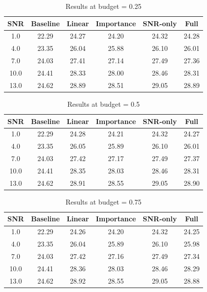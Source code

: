\begin{table}[h]
\centering
\caption{Results at budget = 0.25}
\begin{tabular}{c|ccccc}
\hline
SNR & Baseline & Linear & Importance & SNR-only & Full \\
\hline
1.0 & 22.29 & 24.27 & 24.20 & 24.32 & 24.28 \\
4.0 & 23.35 & 26.04 & 25.88 & 26.10 & 26.01 \\
7.0 & 24.03 & 27.41 & 27.14 & 27.49 & 27.36 \\
10.0 & 24.41 & 28.33 & 28.00 & 28.46 & 28.31 \\
13.0 & 24.62 & 28.89 & 28.51 & 29.05 & 28.89 \\
\hline
\end{tabular}
\end{table}

\begin{table}[h]
\centering
\caption{Results at budget = 0.5}
\begin{tabular}{c|ccccc}
\hline
SNR & Baseline & Linear & Importance & SNR-only & Full \\
\hline
1.0 & 22.29 & 24.28 & 24.21 & 24.32 & 24.27 \\
4.0 & 23.35 & 26.05 & 25.89 & 26.10 & 26.01 \\
7.0 & 24.03 & 27.42 & 27.17 & 27.49 & 27.37 \\
10.0 & 24.41 & 28.35 & 28.03 & 28.46 & 28.31 \\
13.0 & 24.62 & 28.91 & 28.55 & 29.05 & 28.90 \\
\hline
\end{tabular}
\end{table}

\begin{table}[h]
\centering
\caption{Results at budget = 0.75}
\begin{tabular}{c|ccccc}
\hline
SNR & Baseline & Linear & Importance & SNR-only & Full \\
\hline
1.0 & 22.29 & 24.26 & 24.20 & 24.32 & 24.25 \\
4.0 & 23.35 & 26.04 & 25.89 & 26.10 & 25.98 \\
7.0 & 24.03 & 27.42 & 27.16 & 27.49 & 27.34 \\
10.0 & 24.41 & 28.36 & 28.03 & 28.46 & 28.29 \\
13.0 & 24.62 & 28.92 & 28.55 & 29.05 & 28.88 \\
\hline
\end{tabular}
\end{table}

